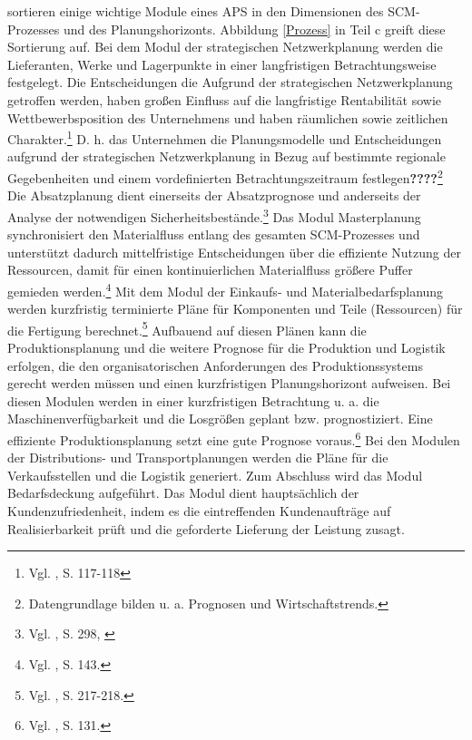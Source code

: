 \cite{meyr2015structure} sortieren einige wichtige Module eines APS in den Dimensionen des SCM-Prozesses und des Planungshorizonts. Abbildung \ref{Prozess} in Teil c greift diese Sortierung auf. Bei dem Modul der strategischen Netzwerkplanung werden die Lieferanten, Werke und Lagerpunkte in einer langfristigen Betrachtungsweise festgelegt. Die Entscheidungen die Aufgrund der strategischen Netzwerkplanung getroffen werden, haben großen Einfluss auf die langfristige Rentabilität sowie Wettbewerbsposition des Unternehmens und haben räumlichen sowie zeitlichen Charakter.\footnote{Vgl. \cite{goetschalckx2005strategic}, S. 117-118} D. h. das Unternehmen die Planungsmodelle und Entscheidungen aufgrund der strategischen Netzwerkplanung in Bezug auf bestimmte regionale Gegebenheiten und einem vordefinierten Betrachtungszeitraum festlegen\textbf{????}\footnote{Datengrundlage bilden u. a. Prognosen und Wirtschaftstrends.} Die Absatzplanung dient einerseits der Absatzprognose und anderseits der Analyse der notwendigen Sicherheitsbestände.\footnote{Vgl. \cite{fleischmeyr2004codp}, S. 298, \label{fleisch}} Das Modul Masterplanung synchronisiert den Materialfluss entlang des gesamten SCM-Prozesses und unterstützt dadurch mittelfristige Entscheidungen über die effiziente Nutzung der Ressourcen, damit für einen kontinuierlichen Materialfluss größere Puffer gemieden werden.\footnote{Vgl. \cite{rohde2002scm}, S. 143.} Mit dem Modul der Einkaufs- und Materialbedarfsplanung werden kurzfristig terminierte Pläne für Komponenten und Teile (Ressourcen) für die Fertigung berechnet.\footnote{Vgl. \cite{stadler2008aps}, S. 217-218.} Aufbauend auf diesen Plänen kann die Produktionsplanung und die weitere Prognose für die Produktion und Logistik erfolgen, die den organisatorischen Anforderungen des Produktionssystems gerecht werden müssen und einen kurzfristigen Planungshorizont aufweisen. Bei diesen Modulen werden in einer kurzfristigen Betrachtung u. a. die Maschinenverfügbarkeit und die Losgrößen geplant bzw. prognostiziert. Eine effiziente Produktionsplanung setzt eine gute Prognose voraus.\footnote{Vgl. \cite{dickersback2004pp}, S. 131.} Bei den Modulen der Distributions- und Transportplanungen werden die Pläne für die Verkaufsstellen und die Logistik generiert. Zum Abschluss wird das Modul Bedarfsdeckung aufgeführt. Das Modul dient hauptsächlich der Kundenzufriedenheit, indem es die eintreffenden Kundenaufträge auf Realisierbarkeit prüft und die geforderte Lieferung der Leistung zusagt.

